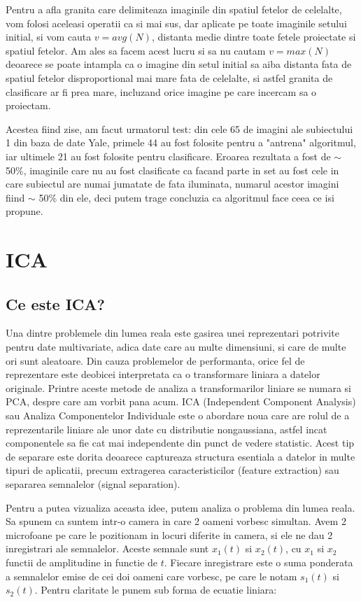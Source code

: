 \documentclass[12pt]{article}
\begin{document}
Pentru a afla granita care delimiteaza imaginile din spatiul fetelor de celelalte, vom folosi aceleasi operatii ca si mai sus, dar aplicate pe toate imaginile setului initial, si vom cauta $v=avg(N)$, distanta medie dintre toate fetele proiectate si spatiul fetelor. Am ales sa facem acest lucru si sa nu cautam $v=max(N)$ deoarece se poate intampla ca o imagine din setul initial sa aiba distanta fata de spatiul fetelor disproportional mai mare fata de celelalte, si astfel granita de clasificare ar fi prea mare, incluzand orice imagine pe care incercam sa o proiectam.

Acestea fiind zise, am facut urmatorul test: din cele 65 de imagini ale subiectului 1 din baza de date Yale, primele 44 au fost folosite pentru a "antrena" algoritmul, iar ultimele 21 au fost folosite pentru clasificare. Eroarea rezultata a fost de $\sim$ 50\%, imaginile care nu au fost clasificate ca facand parte in set au fost cele in care subiectul are numai jumatate de fata iluminata, numarul acestor imagini fiind $\sim$ 50\% din ele, deci putem trage concluzia ca algoritmul face ceea ce isi propune. 

\newpage
\section{ICA}

\subsection{Ce este ICA?}
Una dintre problemele din lumea reala este gasirea unei reprezentari potrivite pentru date multivariate, adica date care au multe dimensiuni, si care de multe ori sunt aleatoare. Din cauza problemelor de performanta, orice fel de reprezentare este deobicei interpretata ca o transformare liniara a datelor originale. Printre aceste metode de analiza a transformarilor liniare se numara si PCA, despre care am vorbit pana acum. ICA (Independent Component Analysis) sau Analiza Componentelor Individuale este o abordare noua care are rolul de a reprezentarile liniare ale unor date cu distributie nongaussiana, astfel incat componentele sa fie cat mai independente din punct de vedere statistic. Acest tip de separare este dorita deoarece captureaza structura esentiala a datelor in multe tipuri de aplicatii, precum extragerea caracteristicilor (feature extraction) sau separarea semnalelor (signal separation). 

Pentru a putea vizualiza aceasta idee, putem analiza o problema din lumea reala. Sa spunem ca suntem intr-o camera in care 2 oameni vorbesc simultan. Avem 2 microfoane pe care le pozitionam in locuri diferite in camera, si ele ne dau 2 inregistrari ale semnalelor. Aceste semnale sunt $x_1 (t)$ si $x_2 (t)$, cu $x_1$ si $x_2$ functii de amplitudine in functie de $t$. Fiecare inregistrare este o suma ponderata a semnalelor emise de cei doi oameni care vorbesc, pe care le notam $s_1(t)$ si $s_2(t)$. Pentru claritate le punem sub forma de ecuatie liniara:
\end{document}
